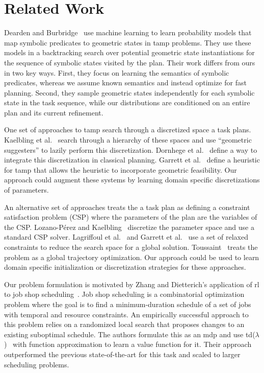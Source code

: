 \section{Related Work}
Dearden and Burbridge~\cite{deardenplanningtamp} use machine learning
to learn probability models that map symbolic predicates to
geometric states in {\sc tamp} problems. They use these models in a
backtracking search over potential geometric state instantiations for
the sequence of symbolic states visited by the plan.  Their work
differs from ours in two key ways. First, they focus on learning the
semantics of symbolic predicates, whereas we assume known semantics
and instead optimize for fast planning. Second, they sample geometric
states independently for each symbolic state in the task sequence,
while our distributions are conditioned on an entire plan and its
current refinement.

One set of approaches to {\sc tamp} search through a discretized space
a task plans. Kaelbling et al.~\cite{kaelbling2011hierarchical} search
through a hierarchy of these spaces and use ``geometric suggesters''
to lazily perform this discretization. Dornhege et
al.~\cite{dornhege2012semantic} define a way to integrate this
discretization in classical planning. Garrett et
al.~\cite{GarrettWAFR14} define a heuristic for {\sc tamp} that allows
the heuristic to incorporate geometric feasibility. Our approach could
augment these systems by learning domain specific discretizations of
parameters.

An alternative set of approaches treats the a task plan as defining a
constraint satisfaction problem (CSP) where the parameters of the plan
are the variables of the CSP. Lozano-P{\'e}rez and
Kaelbling~\cite{lozano2014constraint} discretize the parameter space
and use a standard CSP solver. Lagriffoul et
al.~\cite{lagriffoul2014orientation} and Garrett et
al.~\cite{garrett2015backward} use a set of relaxed constraints to
reduce the search space for a global
solution. Toussaint~\cite{toussaint2015logic} treats the problem as a
global trajectory optimization. Our approach could be used to learn
domain specific initialization or discretization strategies for these
approaches.

Our problem formulation is motivated by Zhang and Dietterich's
application of {\sc rl} to job shop
scheduling~\cite{JobShopSched}. Job shop scheduling is a combinatorial
optimization problem where the goal is to find a minimum-duration
schedule of a set of jobs with temporal and resource constraints. An
empirically successful approach to this problem relies on a randomized
local search that proposes changes to an existing suboptimal
schedule. The authors formulate this as an {\sc mdp} and use {\sc
  td}($\lambda$)~\cite{suttonbarto} with function approximation to
learn a value function for it. Their approach outperformed the
previous state-of-the-art for this task and scaled to larger scheduling
problems.

